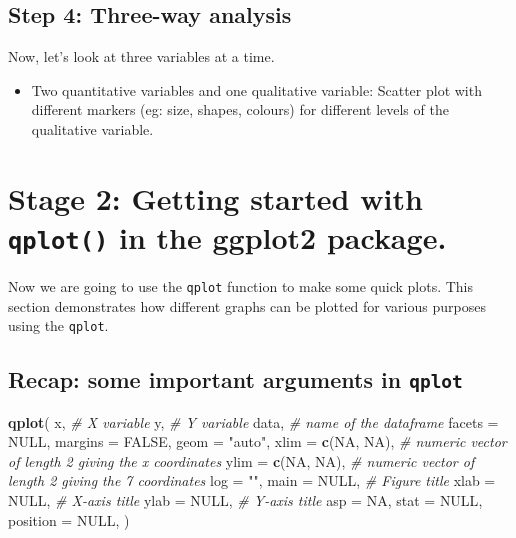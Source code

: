 \documentclass[]{article}
\newenvironment{Shaded}{\begin{snugshade}}{\end{snugshade}}
\newcommand{\CommentTok}[1]{\textcolor[rgb]{0.56,0.35,0.01}{\textit{#1}}}
\newcommand{\DataTypeTok}[1]{\textcolor[rgb]{0.13,0.29,0.53}{#1}}
\newcommand{\KeywordTok}[1]{\textcolor[rgb]{0.13,0.29,0.53}{\textbf{#1}}}
\newcommand{\NormalTok}[1]{#1}
\newcommand{\OtherTok}[1]{\textcolor[rgb]{0.56,0.35,0.01}{#1}}
\newcommand{\StringTok}[1]{\textcolor[rgb]{0.31,0.60,0.02}{#1}}
\providecommand{\tightlist}{%
  \setlength{\itemsep}{0pt}\setlength{\parskip}{0pt}}
\begin{document}
\hypertarget{step-4-three-way-analysis}{%
\subsection{Step 4: Three-way
analysis}\label{step-4-three-way-analysis}}

Now, let's look at three variables at a time.

\begin{itemize}
\tightlist
\item
  Two quantitative variables and one qualitative variable: Scatter plot
  with different markers (eg: size, shapes, colours) for different
  levels of the qualitative variable.
\end{itemize}

\hypertarget{stage-2-getting-started-with-qplot-in-the-ggplot2-package.}{%
\section{\texorpdfstring{Stage 2: Getting started with \texttt{qplot()}
in the ggplot2
package.}{Stage 2: Getting started with qplot() in the ggplot2 package.}}\label{stage-2-getting-started-with-qplot-in-the-ggplot2-package.}}

Now we are going to use the \texttt{qplot} function to make some quick
plots. This section demonstrates how different graphs can be plotted for
various purposes using the \texttt{qplot}.

\hypertarget{recap-some-important-arguments-in-qplot}{%
\subsection{\texorpdfstring{Recap: some important arguments in
\texttt{qplot}}{Recap: some important arguments in qplot}}\label{recap-some-important-arguments-in-qplot}}

\begin{Shaded}
\begin{Highlighting}[]
\KeywordTok{qplot}\NormalTok{(}
\NormalTok{  x, }\CommentTok{# X variable}
\NormalTok{  y, }\CommentTok{# Y variable}
\NormalTok{  data, }\CommentTok{# name of the dataframe}
  \DataTypeTok{facets =} \OtherTok{NULL}\NormalTok{, }
  \DataTypeTok{margins =} \OtherTok{FALSE}\NormalTok{,}
  \DataTypeTok{geom =} \StringTok{"auto"}\NormalTok{,}
  \DataTypeTok{xlim =} \KeywordTok{c}\NormalTok{(}\OtherTok{NA}\NormalTok{, }\OtherTok{NA}\NormalTok{), }\CommentTok{# numeric vector of length 2 giving the x coordinates}
  \DataTypeTok{ylim =} \KeywordTok{c}\NormalTok{(}\OtherTok{NA}\NormalTok{, }\OtherTok{NA}\NormalTok{), }\CommentTok{# numeric vector of length 2 giving the 7 coordinates}
  \DataTypeTok{log =} \StringTok{""}\NormalTok{,}
  \DataTypeTok{main =} \OtherTok{NULL}\NormalTok{, }\CommentTok{# Figure title}
  \DataTypeTok{xlab =} \OtherTok{NULL}\NormalTok{, }\CommentTok{# X-axis title}
  \DataTypeTok{ylab =} \OtherTok{NULL}\NormalTok{, }\CommentTok{# Y-axis title}
  \DataTypeTok{asp =} \OtherTok{NA}\NormalTok{,}
  \DataTypeTok{stat =} \OtherTok{NULL}\NormalTok{,}
  \DataTypeTok{position =} \OtherTok{NULL}\NormalTok{,}
\NormalTok{)}
\end{Highlighting}
\end{Shaded}
\end{document}

